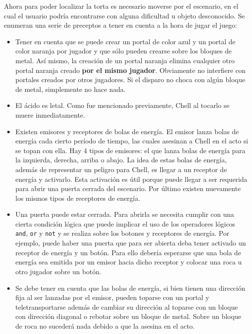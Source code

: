 \documentclass[a4paper]{article}
\begin{document}
Ahora para poder localizar la torta es necesario moverse por el escenario, en el cual el usuario podría encontrarse con alguna dificultad u objeto desconocido. Se enumeran una serie de preceptos a tener en cuenta a la hora de jugar el juego:
\begin{itemize}
	\item Tener en cuenta que se puede crear un portal de color azul y un portal de color naranja por jugador y que sólo pueden crearse sobre los bloques de metal. Así mismo, la creación de un portal naranja elimina cualquier otro portal naranja creado \textbf{por el mismo jugador}. Obviamente no interfiere con portales creados por otros jugadores. Si el disparo no choca con algún bloque de metal, simplemente no hace nada.
	
	\item El ácido es letal. Como fue mencionado previamente, Chell al tocarlo se muere inmediatamente.
	
	\item Existen emisores y receptores de bolas de energía. El emisor lanza bolas de energía cada cierto período de tiempo, las cuales asesinan a Chell en el acto si se topan con ella. Hay 4 tipos de emisores: el que lanza bolas de energía para la izquierda, derecha, arriba o abajo. La idea de estas bolas de energía, además de representar un peligro para Chell, es llegar a un receptor de energía y activarlo. Esta activación es útil porque puede llegar a ser requerida para abrir una puerta cerrada del escenario. Por último existen nuevamente los mismos tipos de receptores de energía.
	
	\item Una puerta puede estar cerrada. Para abrirla se necesita cumplir con una cierta condición lógica que puede implicar el uso de los operadores lógicos \texttt{and}, \texttt{or} y \texttt{not} y se realiza sobre los botones y receptores de energía. Por ejemplo, puede haber una puerta que para ser abierta deba tener activado un receptor de energía y un botón. Para ello debería esperarse que una bola de energía sea emitida por un emisor hacia dicho receptor y colocar una roca u otro jugador sobre un botón.
	
	\item Se debe tener en cuenta que las bolas de energía, si bien tienen una dirección fija al ser lanzadas por el emisor, pueden toparse con un portal y teletransportarse además de cambiar su dirección al toparse con un bloque con dirección diagonal o rebotar sobre un bloque de metal. Sobre un bloque de roca no sucederá nada debido a que la asesina en el acto.


\end{itemize}
\end{document}
